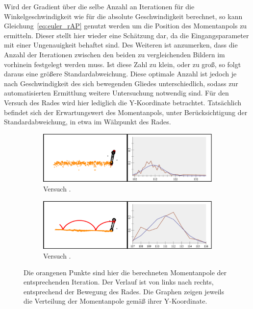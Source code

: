 Wird der Gradient über die selbe Anzahl an Iterationen für die Winkelgeschwindigkeit wie für die absolute Geschwindigkeit berechnet, so kann Gleichung~\ref{eq:euler_rAP} genutzt werden um die Position des Momentanpols zu ermitteln.
Dieser stellt hier wieder eine Schätzung dar, da die Eingangsparameter mit einer Ungenauigkeit behaftet sind.
Des Weiteren ist anzumerken, dass die Anzahl der Iterationen zwischen den beiden zu vergleichenden Bildern im vorhinein festgelegt werden muss.
Ist diese Zahl zu klein, oder zu gro{\ss}, so folgt daraus eine grö{\ss}ere Standardabweichung.
Diese optimale Anzahl ist jedoch je nach Geschwindigkeit des sich bewegenden Gliedes unterschiedlich, sodass zur automatisierten Ermittlung weitere Untersuchung notwendig sind.
Für den Versuch des Rades wird hier lediglich die Y-Koordinate betrachtet.
Tatsächlich befindet sich der Erwartungswert des Momentanpols, unter Berücksichtigung der Standardabweichung, in etwa im Wälzpunkt des Rades.

\begin{figure}
    \centering
    \begin{subfigure}[t]{0.45\textwidth}
        \includegraphics[width=\textwidth]{gfx/drehendes_rad_1.png}
        \caption{Versuch .}\label{fig:drehendes_rad_1}
    \end{subfigure}
    \begin{subfigure}[t]{0.45\textwidth}
        \includegraphics[width=\textwidth]{gfx/drehendes_rad_4.png}
        \caption{Versuch .}\label{fig:drehendes_rad_4}
    \end{subfigure}
    \caption[Versuche  und ]{Die orangenen Punkte sind hier die berechneten Momentanpole der entsprechenden Iteration. Der Verlauf ist von links nach rechts, entsprechend der Bewegung des Rades. Die Graphen zeigen jeweils die Verteilung der Momentanpole gemä{\ss} ihrer Y-Koordinate.}
    \label{fig:drehendes_rad_1_4}
\end{figure}


